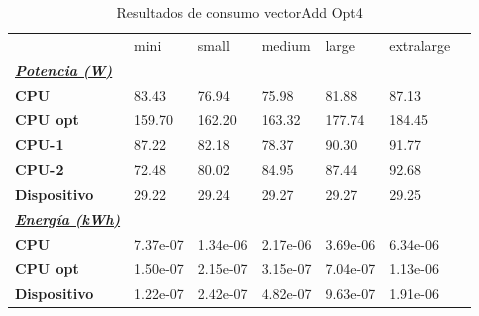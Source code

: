 \begin{table}[H]
    \centering
    \begin{tabular}{lllllll}
    \rowcolor[HTML]{DAE8FC} \ & mini & small & medium & 	large & 	extralarge \\
    \cellcolor[HTML]{DAE8FC} \textbf{\textbf{{\emph{{\underline{{Potencia (W)}}}}}}} &  &  &  & 	 & 	 \\
    \rowcolor[HTML]{EFEFEF} \cellcolor[HTML]{DAE8FC} \textbf{CPU} & 83.43 & 76.94 & 75.98 & 	81.88 & 	87.13 \\
    \cellcolor[HTML]{DAE8FC} \textbf{CPU opt} & 159.70 & 162.20 & 163.32 & 	177.74 & 	184.45 \\
    \rowcolor[HTML]{EFEFEF} \cellcolor[HTML]{DAE8FC} \textbf{\quad CPU-1} & 87.22 & 82.18 & 78.37 & 	90.30 & 	91.77 \\
    \cellcolor[HTML]{DAE8FC} \textbf{\quad CPU-2} & 72.48 & 80.02 & 84.95 & 	87.44 & 	92.68 \\
    \rowcolor[HTML]{EFEFEF} \cellcolor[HTML]{DAE8FC} \textbf{Dispositivo} & 29.22 & 29.24 & 29.27 & 	29.27 & 	29.25 \\
    \cellcolor[HTML]{DAE8FC} \textbf{\textbf{{\emph{{\underline{{Energía (kWh)}}}}}}} &  &  &  & 	 & 	 \\
    \rowcolor[HTML]{EFEFEF} \cellcolor[HTML]{DAE8FC} \textbf{CPU} & 7.37e-07 & 1.34e-06 & 2.17e-06 & 	3.69e-06 & 	6.34e-06 \\
    \cellcolor[HTML]{DAE8FC} \textbf{CPU opt} & 1.50e-07 & 2.15e-07 & 3.15e-07 & 	7.04e-07 & 	1.13e-06 \\
    \rowcolor[HTML]{EFEFEF} \cellcolor[HTML]{DAE8FC} \textbf{Dispositivo} & 1.22e-07 & 2.42e-07 & 4.82e-07 & 	9.63e-07 & 	1.91e-06 \\
    \end{tabular}
    \caption[Resultados de consumo vectorAdd Opt4]{{Resultados de consumo vectorAdd Opt4}}
    \label{table_test_vectorAdd_Opt4_hw_powerResults}
\end{table}
